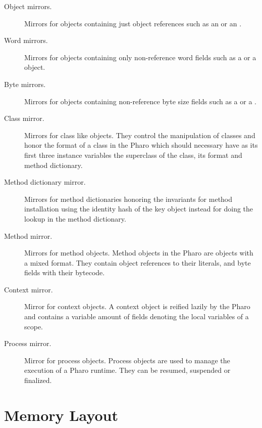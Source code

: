 \begin{description}
\item[Object mirrors.] Mirrors for objects containing just object references such as an  or an .
\item[Word mirrors.] Mirrors for objects containing only non-reference word fields such as a  or a  object.
\item[Byte mirrors.] Mirrors for objects containing non-reference byte size fields such as a  or a . 
\item[Class mirror.] Mirrors for class like objects. They control the manipulation of classes and honor the format of a class in the Pharo \VM which should necessary have as its first three instance variables the superclass of the class, its format and method dictionary.
\item[Method dictionary mirror.] Mirrors for method dictionaries honoring the \VM invariants for method installation \ie using the identity hash of the key object instead for doing the lookup in the method dictionary.
\item[Method mirror.] Mirrors for method objects. Method objects in the Pharo \VM are objects with a mixed format. They contain object references to their literals, and byte fields with their bytecode.
\item[Context mirror.] Mirror for context objects. A context object is reified lazily by the Pharo \VM and contains a variable amount of fields denoting the local variables of a scope.
\item[Process mirror.] Mirror for process objects. Process objects are used to manage the execution of a Pharo runtime. They can be resumed, suspended or finalized.
\end{description}



\section{Memory Layout} \label{sec:memory}

